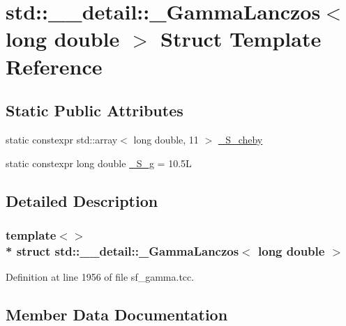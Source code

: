 \hypertarget{structstd_1_1____detail_1_1__GammaLanczos_3_01long_01double_01_4}{}\section{std\+:\+:\+\_\+\+\_\+detail\+:\+:\+\_\+\+Gamma\+Lanczos$<$ long double $>$ Struct Template Reference}
\label{structstd_1_1____detail_1_1__GammaLanczos_3_01long_01double_01_4}
\subsection*{Static Public Attributes}
\begin{DoxyCompactItemize}
\item 
static constexpr std\+::array$<$ long double, 11 $>$ \hyperlink{structstd_1_1____detail_1_1__GammaLanczos_3_01long_01double_01_4_a5e4729a81b6fea142833b8198d5c6260}{\+\_\+\+S\+\_\+cheby}
\item 
static constexpr long double \hyperlink{structstd_1_1____detail_1_1__GammaLanczos_3_01long_01double_01_4_a9748c741681bc10b5679badb0143f47c}{\+\_\+\+S\+\_\+g} = 10.\+5L
\end{DoxyCompactItemize}


\subsection{Detailed Description}
\subsubsection*{template$<$$>$\\*
struct std\+::\+\_\+\+\_\+detail\+::\+\_\+\+Gamma\+Lanczos$<$ long double $>$}



Definition at line 1956 of file sf\+\_\+gamma.\+tcc.



\subsection{Member Data Documentation}
